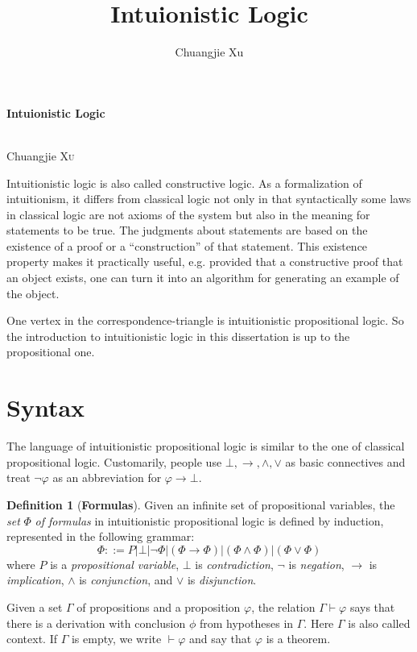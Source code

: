 \documentclass[12pt,a4paper]{article}
\title{Intuionistic Logic}
\author{Chuangjie Xu}
\theoremstyle{definition}
\newtheorem{definition}{Definition}[section]
\theoremstyle{plain}
\theoremstyle{plain}
\theoremstyle{plain}
\begin{document}
\begin{center}
\begin{Large}
\textbf{Intuionistic Logic}
\end{Large}\\[12pt]
Chuangjie \textsc{Xu}
\end{center}

Intuitionistic logic is also called constructive logic. As a formalization of intuitionism, it differs from classical logic not only in that syntactically some laws in classical logic are not axioms of the system but also in the meaning for statements to be true. The judgments about statements are based on the existence of a proof or a ``construction'' of that statement. This existence property makes it practically useful, e.g. provided that a constructive proof that an object exists, one can turn it into an algorithm for generating an example of the object.

One vertex in the correspondence-triangle is intuitionistic propositional logic. So the introduction to intuitionistic logic in this dissertation is up to the propositional one.

\section{Syntax}
\label{il_s}
The language of intuitionistic propositional logic is similar to the one of classical propositional logic. Customarily, people use $ \bot , \to , \land , \lor $ as basic connectives and treat $ \neg \varphi $ as an abbreviation for $ \varphi \to \bot $.

\begin{definition}[\textbf{Formulas}]
Given an infinite set of propositional variables, the \emph{set} $ \Phi $ \emph{of formulas} in intuitionistic propositional logic is defined by induction, represented in the following grammar:
\[
\Phi ::= P | \bot | \neg \Phi | ( \Phi \to \Phi ) | ( \Phi \land \Phi ) | ( \Phi \lor \Phi )
\]
where $ P $ is a \emph{propositional variable}, $ \bot $ is \emph{contradiction}, $ \neg $ is \emph{negation}, $ \to $ is \emph{implication}, $ \land $ is \emph{conjunction}, and $ \lor $ is \emph{disjunction}.
\end{definition}

Given a set $ \Gamma $ of propositions and a proposition $ \varphi $, the relation $ \Gamma \vdash \varphi $ says that there is a derivation with conclusion $ \phi $ from hypotheses in $ \Gamma $. Here $ \Gamma $ is also called context. If $ \Gamma $ is empty, we write $ \vdash \varphi $ and say that $ \varphi $ is a theorem.
\end{document}

